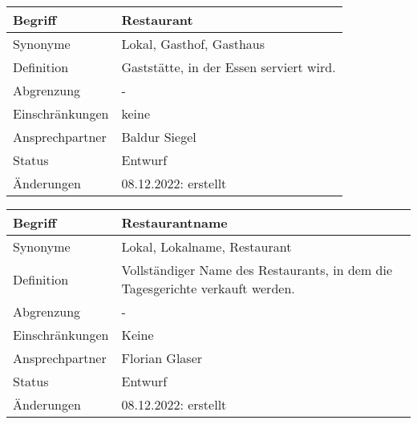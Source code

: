 \begin{table}[H]
    \centering
    \label{gls:restaurant}
    \begin{tabularx}{\textwidth}{| l | X |}
        \hline
        Begriff         & Restaurant                              \\
        \hline
        Synonyme        & Lokal, Gasthof, Gasthaus                \\
        \hline
        Definition      & Gaststätte, in der Essen serviert wird. \\
        \hline
        Abgrenzung      & -                                       \\
        \hline
        Einschränkungen & keine                                   \\
        \hline
        Ansprechpartner & Baldur Siegel                           \\
        \hline
        Status          & Entwurf                                 \\
        \hline
        Änderungen      & 08.12.2022: erstellt                    \\
        \hline
    \end{tabularx}
\end{table}

\begin{table}[H]
    \centering
    \label{gls:restaurantname}
    \begin{tabularx}{\textwidth}{| l | X |}
        \hline
        Begriff         & Restaurantname                                                                \\
        \hline
        Synonyme        & Lokal, Lokalname, Restaurant                                                  \\
        \hline
        Definition      & Vollständiger Name des Restaurants, in dem die Tagesgerichte verkauft werden. \\
        \hline
        Abgrenzung      & -                                                                             \\
        \hline
        Einschränkungen & Keine                                                                         \\
        \hline
        Ansprechpartner & Florian Glaser                                                                \\
        \hline
        Status          & Entwurf                                                                       \\
        \hline
        Änderungen      & 08.12.2022: erstellt                                                          \\
        \hline
    \end{tabularx}
\end{table}

